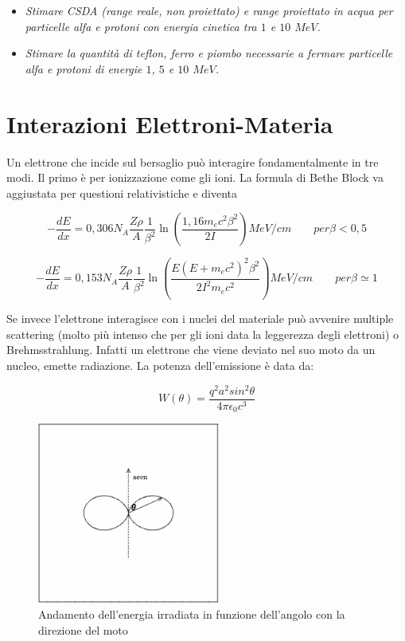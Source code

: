 \begin{itemize}
\item \emph{Stimare CSDA (range reale, non proiettato) e range proiettato in acqua per particelle alfa e protoni con energia cinetica tra $1$ e $10$ $MeV$.}
\item \emph{Stimare la quantità di teflon, ferro e piombo necessarie a fermare particelle alfa e protoni di energie $1$, $5$ e $10$ $MeV$.}
\end{itemize}

\section{Interazioni Elettroni-Materia}

Un elettrone che incide sul bersaglio può interagire fondamentalmente in tre modi. Il primo è per ionizzazione come gli ioni. La formula di Bethe Block va aggiustata per questioni relativistiche e diventa

\begin{equation}
-\frac{dE}{dx}=0,306 N_A\frac{Z\rho}{A}\frac{1}{\beta^2}\ln(\frac{1,16m_ec^2\beta^2}{2I}) MeV/cm\qquad per \beta<0,5
\end{equation}

\begin{equation}
-\frac{dE}{dx}=0,153 N_A\frac{Z\rho}{A}\frac{1}{\beta^2}\ln(\frac{E(E+m_ec^2)^2\beta^2}{2I^2m_ec^2}) MeV/cm \qquad per \beta\simeq 1
\end{equation}

Se invece l'elettrone interagisce con i nuclei del materiale può avvenire multiple scattering (molto più intenso che per gli ioni data la leggerezza degli elettroni) o Brehmsstrahlung. 
Infatti un elettrone che viene deviato nel suo moto da un nucleo, emette radiazione. La potenza dell'emissione è data da:

\begin{equation}
W(\theta)=\frac{q^2a^2sin^2\theta}{4\pi\epsilon_{0}c^3}
\end{equation}

\begin{figure}
\centering
		\includegraphics[width=6cm, keepaspectratio]{figs/brehm.png}
		\caption{Andamento dell'energia irradiata in funzione dell'angolo con la direzione del moto}
         \label{brehmtheta}
\end{figure}

